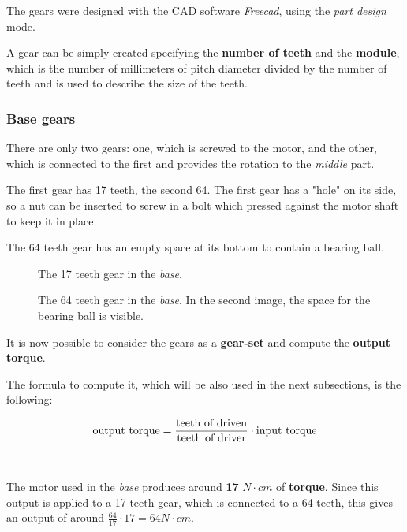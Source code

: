 \documentclass[]{article}
\newcommand{\inctrimpic}[2][1]
{\texttt{[image: \#2]}}
\begin{document}
The gears were designed with the CAD software \textit{Freecad}, using the \textit{part design} mode. 

A gear can be simply created specifying the \textbf{number of teeth} and the \textbf{module}, which is the number of millimeters of pitch diameter divided by the number of teeth and is used to describe the size of the teeth.

\subsubsection{Base gears}

There are only two gears: one, which is screwed to the motor, and the other, which is connected to the first and provides the rotation to the \textit{middle} part.

The first gear has 17 teeth, the second 64. The first gear has a "hole" on its side, so a nut can be inserted to screw in a bolt which pressed against the motor shaft to keep it in place.

The 64 teeth gear has an empty space at its bottom to contain a bearing ball.

\begin{figure}[h]
	\centering
	\subfigure{\inctrimpic[0.45]{images/motors/mot_17_mod08.pdf}}
	\subfigure{\inctrimpic[0.45]{images/motors/mot_17_mod08_2.pdf}}
	\caption{The 17 teeth gear in the \textit{base}.}
	\label{fig:17base}
\end{figure}

\begin{figure}[h]
	\centering
	\subfigure{\inctrimpic[0.45]{images/motors/mot_64_mod08.pdf}}
	\subfigure{\inctrimpic[0.45]{images/motors/mot_64_mod08_2.pdf}}
	\caption{The 64 teeth gear in the \textit{base}. In the second image, the space for the bearing ball is visible.}
	\label{fig:64base}
\end{figure}

It is now possible to consider the gears as a \textbf{gear-set} and compute the \textbf{output torque}. 

The formula to compute it, which will be also used in the next subsections, is the following:

$$ \textnormal{output torque} = \frac{\textnormal{teeth of driven}}{\textnormal{teeth of driver}}\cdot \textnormal{input torque}$$
\\
\\
The motor used in the \textit{base} produces around \textbf{17} $N\cdot cm$ of \textbf{torque}. Since this output is applied to a 17 teeth gear, which is connected to a 64 teeth, this gives an output of around $ \frac{64}{17}\cdot{17} = 64 N\cdot cm$.
\end{document}
